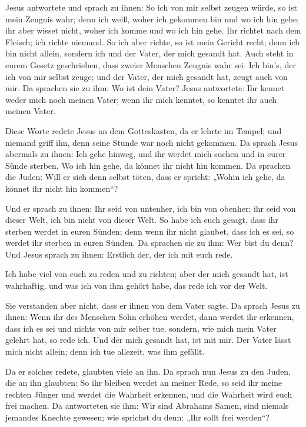  Jesus antwortete und sprach zu ihnen: So ich von mir
selbst zeugen würde, so ist mein Zeugnis wahr; denn ich weiß, woher ich
gekommen bin und wo ich hin gehe; ihr aber wisset nicht, woher ich komme
und wo ich hin gehe.  Ihr richtet nach dem Fleisch; ich
richte niemand.  So ich aber richte, so ist mein Gericht
recht; denn ich bin nicht allein, sondern ich und der Vater, der mich
gesandt hat.  Auch steht in eurem Gesetz geschrieben,
dass zweier Menschen Zeugnis wahr sei.  Ich bin's, der
ich von mir selbst zeuge; und der Vater, der mich gesandt hat, zeugt
auch von mir.  Da sprachen sie zu ihm: Wo ist dein Vater?
Jesus antwortete: Ihr kennet weder mich noch meinen Vater; wenn ihr mich
kenntet, so kenntet ihr auch meinen Vater.

 Diese Worte redete Jesus an dem Gotteskasten, da er
lehrte im Tempel; und niemand griff ihn, denn seine Stunde war noch
nicht gekommen.  Da sprach Jesus abermals zu ihnen: Ich
gehe hinweg, und ihr werdet mich suchen und in eurer Sünde sterben. Wo
ich hin gehe, da könnet ihr nicht hin kommen.  Da
sprachen die Juden: Will er sich denn selbst töten, dass er spricht:
„Wohin ich gehe, da könnet ihr nicht hin kommen``?

 Und er sprach zu ihnen: Ihr seid von untenher, ich bin
von obenher; ihr seid von dieser Welt, ich bin nicht von dieser Welt.
 So habe ich euch gesagt, dass ihr sterben werdet in
euren Sünden; denn wenn ihr nicht glaubet, dass ich es sei, so werdet
ihr sterben in euren Sünden.  Da sprachen sie zu ihm: Wer
bist du denn? Und Jesus sprach zu ihnen: Erstlich der, der ich mit euch
rede.

 Ich habe viel von euch zu reden und zu richten; aber der
mich gesandt hat, ist wahrhaftig, und was ich von ihm gehört habe, das
rede ich vor der Welt.

 Sie verstanden aber nicht, dass er ihnen von dem Vater
sagte.  Da sprach Jesus zu ihnen: Wenn ihr des Menschen
Sohn erhöhen werdet, dann werdet ihr erkennen, dass ich es sei und
nichts von mir selber tue, sondern, wie mich mein Vater gelehrt hat, so
rede ich.  Und der mich gesandt hat, ist mit mir. Der
Vater lässt mich nicht allein; denn ich tue allezeit, was ihm gefällt.

 Da er solches redete, glaubten viele an ihn.
 Da sprach nun Jesus zu den Juden, die an ihn glaubten:
So ihr bleiben werdet an meiner Rede, so seid ihr meine rechten Jünger
 und werdet die Wahrheit erkennen, und die Wahrheit wird
euch frei machen.  Da antworteten sie ihm: Wir sind
Abrahams Samen, sind niemals jemandes Knechte gewesen; wie sprichst du
denn: „Ihr sollt frei werden``?

